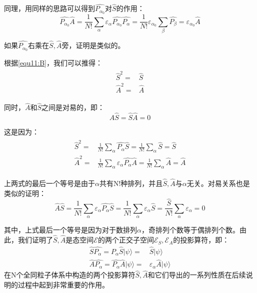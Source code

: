     同理，用同样的思路可以得到$\hat{P_{\alpha_0}}$对$\hat{S}$的作用：
    \begin{equation}
        \hat{P_{\alpha_0}}\hat{A}=\frac{1}{N!}\sum_\alpha \varepsilon_\alpha\hat{P_{\alpha_0}}\hat{P_\alpha}=\frac{1}{N!}\varepsilon_{\alpha_0}\sum_\beta \hat{P_\beta}=\varepsilon_{\alpha_0}\hat{A}
    \end{equation}
    
    如果$\hat{P_{\alpha_0}}$右乘在$\hat{S},\hat{A}$旁，证明是类似的。
    
    根据\eqref{equ11:B}，我们可以推得：
    \begin{align}
        \begin{split}
            \hat{S}^2=&\hat{S}\\
            \hat{A}^2=&\hat{A}
        \end{split}
    \end{align}
    
    同时，$\hat{A}$和$\hat{S}$之间是对易的，即：
    \begin{equation}
        \hat{A}\hat{S}=\hat{S}\hat{A}=0
    \end{equation}
    
    这是因为：
    \begin{align}
        \begin{split}
            \hat{S}^2=&\frac{1}{N!}\sum_\alpha\hat{P_\alpha}\hat{S}=\frac{1}{N!}\sum_\alpha\hat{S}=\hat{S}\\
            \hat{A}^2=&\frac{1}{N!}\sum_\alpha\varepsilon_\alpha\hat{P_\alpha}\hat{A}=\frac{1}{N!}\sum_\alpha\hat{A}=\hat{A}
        \end{split}
    \end{align}
    
    上两式的最后一个等号是由于$\alpha$共有N!种排列，并且$\hat{S},\hat{A}$与$\alpha$无关。对易关系也是类似的证明：
    \begin{equation}
        \hat{A}\hat{S}=\frac{1}{N!}\sum_\alpha\varepsilon_\alpha\hat{P_\alpha}\hat{S}=\frac{1}{N!}\sum_\alpha\varepsilon_\alpha\hat{S}=\frac{\hat{S}}{N!}\sum_\alpha \varepsilon_\alpha=0
    \end{equation}
    
    其中，上式最后一个等号是因为对于数排列$\alpha$，奇排列个数等于偶排列个数。由此，我们证明了$\hat{S},\hat{A}$是态空间$\mathscr{E}$的两个正交子空间$\mathscr{E}_S,\mathscr{E}_A$的投影算符，即：
    \begin{align}
        \hat{S}\hat{P_\alpha}=\hat{P_\alpha}\hat{S}|\psi\rangle=&\hat{S}|\psi\rangle\\
        \hat{A}\hat{P_\alpha}=\hat{P_\alpha}\hat{A}|\psi\rangle=&\varepsilon_\alpha\hat{A}|\psi\rangle
    \end{align}
    在N个全同粒子体系中构造的两个投影算符$\hat{S},\hat{A}$和它们导出的一系列性质在后续说明的过程中起到非常重要的作用。
